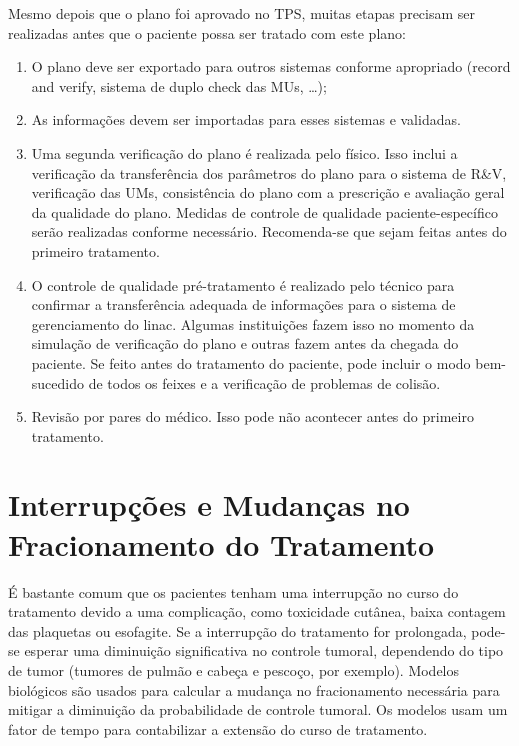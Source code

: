 \documentclass[11pt,a4paper]{article}
\newcounter{exemplo}
\begin{document}
	Mesmo depois que o plano foi aprovado no TPS, muitas etapas precisam ser realizadas antes que o paciente possa ser tratado com este plano:

	\begin{enumerate}[label=\textcolor{CarnationPink}{\arabic*${}^\circ$}]
		\item O plano deve ser exportado para outros sistemas conforme apropriado (record and verify, sistema de duplo check das MUs, \dots);
		\item As informações devem ser importadas para esses sistemas e validadas.
		\item Uma segunda verificação do plano é realizada pelo físico. Isso inclui a verificação da transferência dos parâmetros do plano para o sistema de R\&V, verificação das UMs, consistência do plano com a prescrição e avaliação geral da qualidade do plano. Medidas de controle de qualidade paciente-específico serão realizadas conforme necessário. Recomenda-se que sejam feitas antes do primeiro tratamento.
		\item O controle de qualidade pré-tratamento é realizado pelo técnico para confirmar a transferência adequada de informações para o sistema de gerenciamento do linac. Algumas instituições fazem isso no momento da simulação de verificação do plano e outras fazem antes da chegada do paciente. Se feito antes do tratamento do paciente, pode incluir o modo bem-sucedido de todos os feixes e a verificação de problemas de colisão.
		\item Revisão por pares do médico. Isso pode não acontecer antes do primeiro tratamento.
	\end{enumerate}

\section{Interrupções e Mudanças no Fracionamento do Tratamento}

	É bastante comum que os pacientes tenham uma interrupção no curso do tratamento devido a uma complicação, como toxicidade cutânea, baixa contagem das plaquetas ou esofagite. Se a interrupção do tratamento for prolongada, pode-se esperar uma diminuição significativa no controle tumoral, dependendo do tipo de tumor (tumores de pulmão e cabeça e pescoço, por exemplo). Modelos biológicos são usados para calcular a mudança no fracionamento necessária para mitigar a diminuição da probabilidade de controle tumoral. Os modelos usam um fator de tempo para contabilizar a extensão do curso de tratamento.
	
\end{document}
